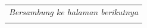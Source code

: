 \begin{longtable}{|m{2cm}|m{3.5cm}|m{4.5cm}|m{4.5cm}|}
    \hline \multicolumn{4}{r}{\textit{Bersambung ke halaman berikutnya}}                                                                                                                                                                                                                                                                                                                                                                                                                                                                                                                                                                                 \\
    \endfoot %

    \hline
    \endlastfoot %


\end{longtable}

